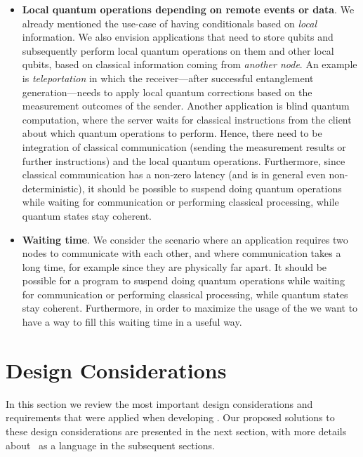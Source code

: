 \begin{itemize}
      \item \textbf{Local quantum operations depending on remote events or data}.
            We already mentioned the use-case of having conditionals based on \emph{local} information.
            We also envision applications that need to store qubits and subsequently perform local quantum operations on them and other local qubits, based on classical information coming from \textit{another node}.
            An example is \textit{teleportation} in which the receiver---after successful entanglement generation---needs to apply local quantum corrections based on the measurement outcomes of the sender.
            Another application is blind quantum computation, where the server waits for classical instructions from the client about which quantum operations to perform.
            Hence, there need to be integration of classical communication (sending the measurement results or further instructions) and the local quantum operations.
            Furthermore, since classical communication has a non-zero latency (and is in general even non-deterministic), it should be possible to suspend doing quantum operations while waiting for communication or performing classical processing, while quantum states stay coherent.


      \item \textbf{Waiting time}.
            We consider the scenario where an application requires two nodes to communicate with each other, and where communication takes a long time, for example since they are physically far apart.
            It should be possible for a program to suspend doing quantum operations while waiting for communication or performing classical processing, while quantum states stay coherent.
            Furthermore, in order to maximize the usage of the \QNPU we want to have a way to fill this waiting time in a useful way.
\end{itemize}


\section{Design Considerations}
\label{sec:design_considerations}
In this section we review the most important design considerations and requirements that were applied when
developing \netqasm.
Our proposed solutions to these design considerations are presented in the next section, with more details about \netqasm\ as a language
in the subsequent sections.

